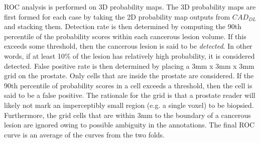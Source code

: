 ROC analysis is performed on 3D probability maps. The 3D probability maps are first formed for each case by taking the 2D probability map outputs from $CAD_{DL}$ and stacking them. Detection rate is then determined by computing the 90th percentile of the probability scores within each cancerous lesion volume. If this exceeds some threshold, then the cancerous lesion is said to be \textit{detected}. In other words, if at least 10\% of the lesion has relatively high probability, it is considered detected. False positive rate is then determined by placing a 3mm x 3mm x 3mm grid on the prostate. Only cells that are inside the prostate are considered. If the 90th percentile of probability scores in a cell exceeds a threshold, then the cell is said to be a false positive. The rationale for the grid is that a prostate reader will likely not mark an imperceptibly small region (e.g. a single voxel) to be biopsied. Furthermore, the grid cells that are within 3mm to the boundary of a cancerous lesion are ignored owing to possible ambiguity in the annotations. The final ROC curve is an average of the curves from the two folds.


